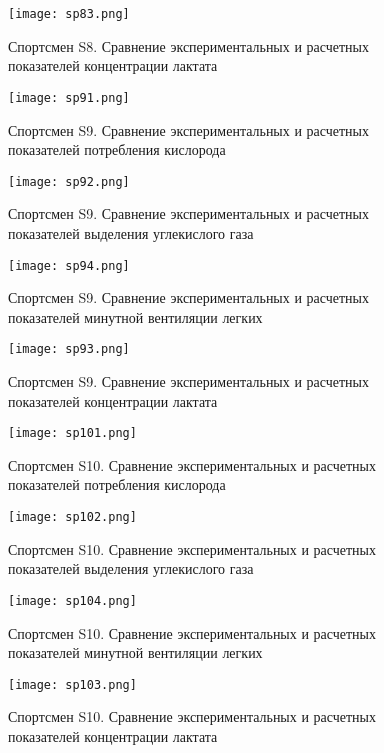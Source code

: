 \begin{figure}[!ht]
	\centering
	\texttt{[image: sp83.png]}
	\caption{Спортсмен S8. Сравнение экспериментальных и расчетных показателей концентрации лактата} 
\end{figure}

\begin{figure}[!ht]
	\centering
	\texttt{[image: sp91.png]}
	\caption{Спортсмен S9. Сравнение экспериментальных и расчетных показателей потребления кислорода } 
\end{figure}

\begin{figure}[!ht]
	\centering
	\texttt{[image: sp92.png]}
	\caption{Спортсмен S9. Сравнение экспериментальных и расчетных показателей выделения углекислого газа} 
\end{figure}

\begin{figure}[!ht]
	\centering
	\texttt{[image: sp94.png]}
	\caption{Спортсмен S9. Сравнение экспериментальных и расчетных показателей минутной вентиляции легких} 
\end{figure}

\begin{figure}[!ht]
	\centering
	\texttt{[image: sp93.png]}
	\caption{Спортсмен S9. Сравнение экспериментальных и расчетных показателей концентрации лактата} 
\end{figure}

\begin{figure}[!ht]
	\centering
	\texttt{[image: sp101.png]}
	\caption{Спортсмен S10. Сравнение экспериментальных и расчетных показателей потребления кислорода } 
\end{figure}

\begin{figure}[!ht]
	\centering
	\texttt{[image: sp102.png]}
	\caption{Спортсмен S10. Сравнение экспериментальных и расчетных показателей выделения углекислого газа} 
\end{figure}

\begin{figure}[!ht]
	\centering
	\texttt{[image: sp104.png]}
	\caption{Спортсмен S10. Сравнение экспериментальных и расчетных показателей минутной вентиляции легких} 
\end{figure}

\begin{figure}[!ht]
	\centering
	\texttt{[image: sp103.png]}
	\caption{Спортсмен S10. Сравнение экспериментальных и расчетных показателей концентрации лактата} 
\end{figure}